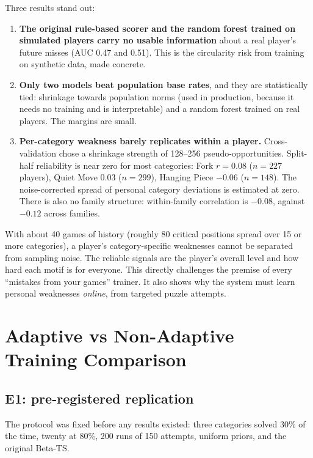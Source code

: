 Three results stand out:
\begin{enumerate}
  \item \textbf{The original rule-based scorer and the random forest trained on simulated players carry
        no usable information} about a real player's future misses (AUC 0.47 and 0.51). This is the
        circularity risk from training on synthetic data, made concrete.
  \item \textbf{Only two models beat population base rates}, and they are statistically tied:
        shrinkage towards population norms (used in production, because it needs no training and is
        interpretable) and a random forest trained on real players. The margins are small.
  \item \textbf{Per-category weakness barely replicates within a player.} Cross-validation chose a
        shrinkage strength of 128--256 pseudo-opportunities. Split-half reliability is near zero for
        most categories: Fork $r=0.08$ ($n=227$ players), Quiet Move $0.03$ ($n=299$), Hanging Piece
        $-0.06$ ($n=148$). The noise-corrected spread of personal category deviations is estimated at
        zero. There is also no family structure: within-family correlation is $-0.08$, against $-0.12$
        across families.
\end{enumerate}

\begin{finding}
With about 40 games of history (roughly 80 critical positions spread over 15 or more categories), a
player's category-specific weaknesses cannot be separated from sampling noise. The reliable signals are
the player's overall level and how hard each motif is for everyone. This directly challenges the
premise of every ``mistakes from your games'' trainer. It also shows why the system must learn personal
weaknesses \emph{online}, from targeted puzzle attempts.
\end{finding}

\section{Adaptive vs Non-Adaptive Training Comparison}

\subsection{E1: pre-registered replication}

The protocol was fixed before any results existed: three categories solved 30\% of the time, twenty at
80\%, 200 runs of 150 attempts, uniform priors, and the original Beta-TS.

